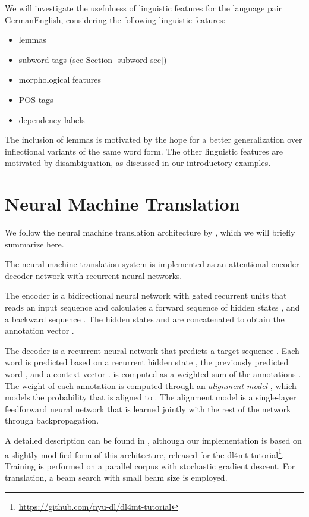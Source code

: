 \documentclass[11pt]{article}
\begin{document}
We will investigate the usefulness of linguistic features for the language pair GermanEnglish, considering the following linguistic features:

\begin{itemize}

\item lemmas
\item subword tags (see Section \ref{subword-sec})
\item morphological features
\item POS tags
\item dependency labels
\end{itemize}

The inclusion of lemmas is motivated by the hope for a better generalization over inflectional variants of the same word form.
The other linguistic features are motivated by disambiguation, as discussed in our introductory examples.


\section{Neural Machine Translation}

We follow the neural machine translation architecture by , which we will briefly summarize here.

The neural machine translation system is implemented as an attentional encoder-decoder network with recurrent neural networks.

The encoder is a bidirectional neural network with gated recurrent units \cite{cho-EtAl:2014:EMNLP2014} that reads an input sequence  and calculates a forward sequence of hidden states ,
and a backward sequence .
The hidden states  and  are concatenated to obtain the annotation vector .

The decoder is a recurrent neural network that predicts a target sequence .
Each word  is predicted based on a recurrent hidden state , the previously predicted word , and a context vector .
 is computed as a weighted sum of the annotations .
The weight of each annotation  is computed through an \emph{alignment model} , which models the probability that  is aligned to .
The alignment model is a single-layer feedforward neural network that is learned jointly with the rest of the network through backpropagation.

A detailed description can be found in \cite{DBLP:journals/corr/BahdanauCB14}, although our implementation is based on a slightly modified form of this architecture, released for the dl4mt 
tutorial\footnote{\url{https://github.com/nyu-dl/dl4mt-tutorial}}. 
Training is performed on a parallel corpus with stochastic gradient descent.
For translation, a beam search with small beam size is employed.
\end{document}
